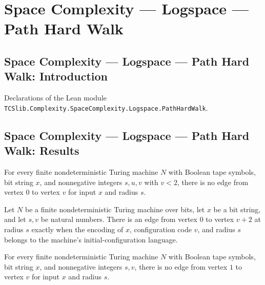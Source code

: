 \section{Space Complexity --- Logspace --- Path Hard Walk}
\subsection*{Space Complexity --- Logspace --- Path Hard Walk: Introduction}

Declarations of the Lean module \texttt{TCSlib.Complexity.SpaceComplexity.Logspace.PathHardWalk}.

\subsection*{Space Complexity --- Logspace --- Path Hard Walk: Results}

\begin{lemma}
\label{Complexity.PathHard.not_edge_zero}
\leanok
{}
For every finite nondeterministic Turing machine $N$ with Boolean tape symbols, bit
string $x$, and nonnegative integers $s,u,v$ with $v<2$, there is no edge from vertex
$0$ to vertex $v$ for input $x$ and radius $s$.
\end{lemma}

\begin{lemma}
\label{Complexity.PathHard.edge_zero_iff}
\leanok
{}
Let $N$ be a finite nondeterministic Turing machine over bits, let $x$ be a bit string,
and let $s,v$ be natural numbers. There is an edge from vertex $0$ to vertex $v+2$ at
radius $s$ exactly when the encoding of $x$, configuration code $v$, and radius $s$
belongs to the machine's initial-configuration language.
\end{lemma}

\begin{lemma}
\label{Complexity.PathHard.not_edge_one}
\leanok
{}
For every finite nondeterministic Turing machine $N$ with Boolean tape symbols, bit
string $x$, and nonnegative integers $s,v$, there is no edge from vertex $1$ to vertex
$v$ for input $x$ and radius $s$.
\end{lemma}


